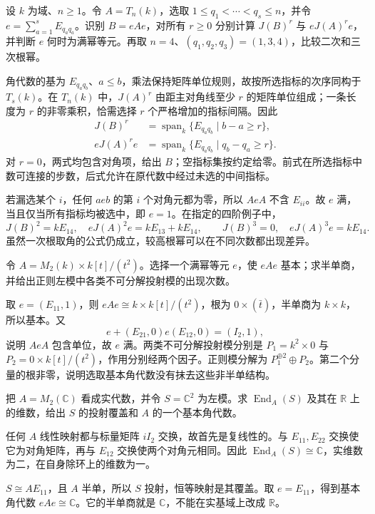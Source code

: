 \begin{exercise}\label{b2:ex:15-corner-filtration}
	设 \(k\) 为域、\(n\ge1\)。令 \(A=T_n(k)\)，选取 \(1\le q_1<\cdots<q_s\le n\)，并令 \(e=\sum_{a=1}^sE_{q_aq_a}\)。识别 \(B=eAe\)，对所有 \(r\ge0\) 分别计算 \(J(B)^r\) 与 \(eJ(A)^re\)，并判断 \(e\) 何时为满幂等元。再取 \(n=4\)、\((q_1,q_2,q_3)=(1,3,4)\)，比较二次和三次根幂。
\end{exercise}
\begin{solution}
	角代数的基为 \(E_{q_aq_b}\)、\(a\le b\)，乘法保持矩阵单位规则，故按所选指标的次序同构于 \(T_s(k)\)。在 \(T_n(k)\) 中，\(J(A)^r\) 由距主对角线至少 \(r\) 的矩阵单位组成；一条长度为 \(r\) 的非零乘积，恰需选择 \(r\) 个严格增加的指标间隔。因此
	\[
		\begin{aligned}
			J(B)^r&=\operatorname{span}_k\{E_{q_aq_b}\mid b-a\ge r\},\\
			eJ(A)^re&=\operatorname{span}_k\{E_{q_aq_b}\mid q_b-q_a\ge r\}.
		\end{aligned}
	\]
	对 \(r=0\)，两式均包含对角项，给出 \(B\)；空指标集按约定给零。前式在所选指标中数可连接的步数，后式允许在原代数中经过未选的中间指标。

	若漏选某个 \(i\)，任何 \(aeb\) 的第 \(i\) 个对角元都为零，所以 \(AeA\) 不含 \(E_{ii}\)。故 \(e\) 满，当且仅当所有指标均被选中，即 \(e=1\)。在指定的四阶例子中，
	\[
		J(B)^2=kE_{14},\quad eJ(A)^2e=kE_{13}+kE_{14},\qquad J(B)^3=0,\quad eJ(A)^3e=kE_{14}.
	\]
	虽然一次根取角的公式仍成立，较高根幂可以在不同次数都出现差异。
\end{solution}

\begin{exercise}\label{b2:ex:15-basic-corner-example}
	令 \(A=M_2(k)\times k[t]/(t^2)\)。选择一个满幂等元 \(e\)，使 \(eAe\) 基本；求半单商，并给出正则左模中各类不可分解投射模的出现次数。
\end{exercise}
\begin{solution}
	取 \(e=(E_{11},1)\)，则 \(eAe\cong k\times k[t]/(t^2)\)，根为 \(0\times(\bar t)\)，半单商为 \(k\times k\)，所以基本。又
	\[
		e+(E_{21},0)e(E_{12},0)=(I_2,1),
	\]
	说明 \(AeA\) 包含单位，故 \(e\) 满。两类不可分解投射模分别是 \(P_1=k^2\times0\) 与 \(P_2=0\times k[t]/(t^2)\)，作用分别经两个因子。正则模分解为 \(P_1^{\oplus2}\oplus P_2\)。第二个分量的根非零，说明选取基本角代数没有抹去这些非半单结构。
\end{solution}

\begin{exercise}\label{b2:ex:15-real-simple-division-ring}
	把 \(A=M_2(\mathbb C)\) 看成实代数，并令 \(S=\mathbb C^2\) 为左模。求 \(\operatorname{End}_A(S)\) 及其在 \(\mathbb R\) 上的维数，给出 \(S\) 的投射覆盖和 \(A\) 的一个基本角代数。
\end{exercise}
\begin{solution}
	任何 \(A\) 线性映射都与标量矩阵 \(iI_2\) 交换，故首先是复线性的。与 \(E_{11},E_{22}\) 交换使它为对角矩阵，再与 \(E_{12}\) 交换使两个对角元相同。因此 \(\operatorname{End}_A(S)\cong\mathbb C\)，实维数为二，在自身除环上的维数为一。

	\(S\cong AE_{11}\)，且 \(A\) 半单，所以 \(S\) 投射，恒等映射是其覆盖。取 \(e=E_{11}\)，得到基本角代数 \(eAe\cong\mathbb C\)。它的半单商就是 \(\mathbb C\)，不能在实基域上改成 \(\mathbb R\)。
\end{solution}

